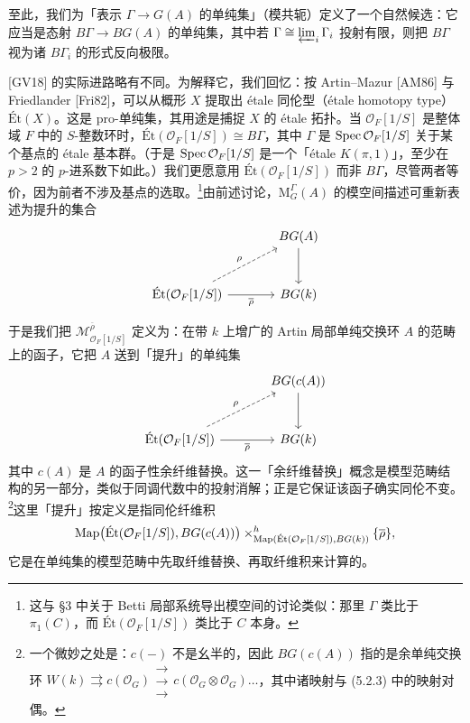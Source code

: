 至此，我们为「表示 $\Gamma\to G(A)$ 的单纯集」（模共轭）定义了一个自然候选：它应当是态射 $B\Gamma\to BG(A)$ 的单纯集，其中若 $\Gamma\cong\varprojlim_i\Gamma_i$ 投射有限，则把 $B\Gamma$ 视为诸 $B\Gamma_i$ 的形式反向极限。

[GV18] 的实际进路略有不同。为解释它，我们回忆：按 Artin--Mazur [AM86] 与 Friedlander [Fri82]，可以从概形 $X$ 提取出 \'etale 同伦型（\'etale homotopy type）$\text{\'Et}(X)$。这是 pro-单纯集，其用途是捕捉 $X$ 的 \'etale 拓扑。当 $\mathcal O_F[1/S]$ 是整体域 $F$ 中的 $S$-整数环时，$\text{\'Et}(\mathcal O_F[1/S])\cong B\Gamma$，其中 $\Gamma$ 是 $\operatorname{Spec}\mathcal O_F[1/S]$ 关于某个基点的 \'etale 基本群。（于是 $\operatorname{Spec}\mathcal O_F[1/S]$ 是一个「\'etale $K(\pi,1)$」，至少在 $p>2$ 的 $p$-进系数下如此。）我们更愿意用 $\text{\'Et}(\mathcal O_F[1/S])$ 而非 $B\Gamma$，尽管两者等价，因为前者不涉及基点的选取。\footnote{这与 §3 中关于 Betti 局部系统导出模空间的讨论类似：那里 $\Gamma$ 类比于 $\pi_1(C)$，而 $\text{\'Et}(\mathcal O_F[1/S])$ 类比于 $C$ 本身。}由前述讨论，$\mathrm M^\Gamma_G(A)$ 的模空间描述可重新表述为提升的集合
\[
\begin{tikzcd}[column sep=large, row sep=large]
& BG(A)\arrow[d]\\
\text{\'Et}(\mathcal O_F[1/S])\arrow[r,"\overline\rho"']\arrow[ur,"\rho",dashed] & BG(k)
\end{tikzcd}
\]

于是我们把 $\mathcal M^{\overline\rho}_{\mathcal O_F[1/S]}$ 定义为：在带 $k$ 上增广的 Artin 局部单纯交换环 $A$ 的范畴上的函子，它把 $A$ 送到「提升」的单纯集
\[
\begin{tikzcd}[column sep=large, row sep=large]
& BG(c(A))\arrow[d]\\
\text{\'Et}(\mathcal O_F[1/S])\arrow[r,"\overline\rho"']\arrow[ur,"\rho",dashed] & BG(k)
\end{tikzcd}
\]
其中 $c(A)$ 是 $A$ 的函子性余纤维替换。这一「余纤维替换」概念是模型范畴结构的另一部分，类似于同调代数中的投射消解；正是它保证该函子确实同伦不变。\footnote{一个微妙之处是：$c(-)$ 不是幺半的，因此 $BG(c(A))$ 指的是余单纯交换环 $W(k)\rightrightarrows c(\mathcal O_G)\mathrel{\substack{\longrightarrow\\[-2pt]\longrightarrow\\[-2pt]\longrightarrow}}c(\mathcal O_G\otimes\mathcal O_G)\ldots$，其中诸映射与 (5.2.3) 中的映射对偶。}这里「提升」按定义是指同伦纤维积
\[
\operatorname{Map}\bigl(\text{\'Et}(\mathcal O_F[1/S]),BG(c(A))\bigr)\times^{h}_{\operatorname{Map}(\text{\'Et}(\mathcal O_F[1/S]),BG(k))}\{\overline\rho\},
\]
它是在单纯集的模型范畴中先取纤维替换、再取纤维积来计算的。

